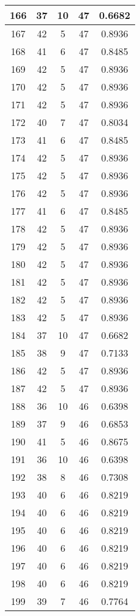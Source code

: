 \documentclass[letterpaper, 12pt]{article}
\begin{document}
\begin{longtable}{|c|c|c|c|c|}
\hline
166 & 37 & 10 & 47 & 0.6682 \\
\hline
167 & 42 & 5 & 47 & 0.8936 \\
\hline
168 & 41 & 6 & 47 & 0.8485 \\
\hline
169 & 42 & 5 & 47 & 0.8936 \\
\hline
170 & 42 & 5 & 47 & 0.8936 \\
\hline
171 & 42 & 5 & 47 & 0.8936 \\
\hline
172 & 40 & 7 & 47 & 0.8034 \\
\hline
173 & 41 & 6 & 47 & 0.8485 \\
\hline
174 & 42 & 5 & 47 & 0.8936 \\
\hline
175 & 42 & 5 & 47 & 0.8936 \\
\hline
176 & 42 & 5 & 47 & 0.8936 \\
\hline
177 & 41 & 6 & 47 & 0.8485 \\
\hline
178 & 42 & 5 & 47 & 0.8936 \\
\hline
179 & 42 & 5 & 47 & 0.8936 \\
\hline
180 & 42 & 5 & 47 & 0.8936 \\
\hline
181 & 42 & 5 & 47 & 0.8936 \\
\hline
182 & 42 & 5 & 47 & 0.8936 \\
\hline
183 & 42 & 5 & 47 & 0.8936 \\
\hline
184 & 37 & 10 & 47 & 0.6682 \\
\hline
185 & 38 & 9 & 47 & 0.7133 \\
\hline
186 & 42 & 5 & 47 & 0.8936 \\
\hline
187 & 42 & 5 & 47 & 0.8936 \\
\hline
188 & 36 & 10 & 46 & 0.6398 \\
\hline
189 & 37 & 9 & 46 & 0.6853 \\
\hline
190 & 41 & 5 & 46 & 0.8675 \\
\hline
191 & 36 & 10 & 46 & 0.6398 \\
\hline
192 & 38 & 8 & 46 & 0.7308 \\
\hline
193 & 40 & 6 & 46 & 0.8219 \\
\hline
194 & 40 & 6 & 46 & 0.8219 \\
\hline
195 & 40 & 6 & 46 & 0.8219 \\
\hline
196 & 40 & 6 & 46 & 0.8219 \\
\hline
197 & 40 & 6 & 46 & 0.8219 \\
\hline
198 & 40 & 6 & 46 & 0.8219 \\
\hline
199 & 39 & 7 & 46 & 0.7764 \\
\hline
\end{longtable}
\end{document}
